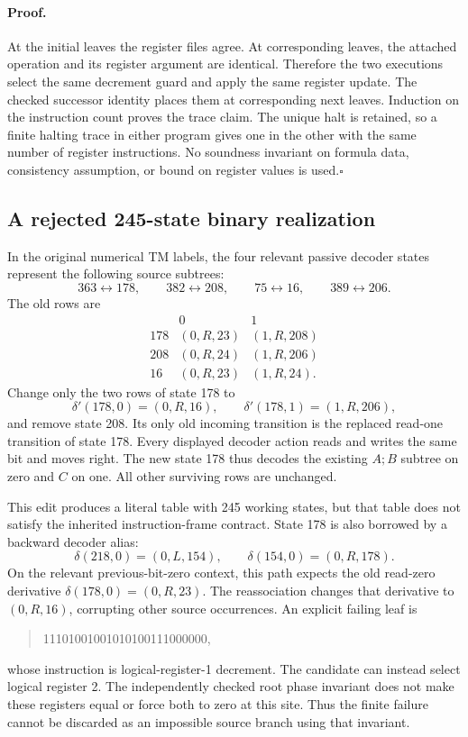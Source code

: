 \paragraph{Proof.}
At the initial leaves the register files agree.  At corresponding leaves,
the attached operation and its register argument are identical.  Therefore
the two executions select the same decrement guard and apply the same
register update.  The checked successor identity places them at
corresponding next leaves.  Induction on the instruction count proves the
trace claim.  The unique halt is retained, so a finite halting trace in
either program gives one in the other with the same number of register
instructions.  No soundness invariant on formula data, consistency
assumption, or bound on register values is used.\hfill$\square$

\subsection{A rejected 245-state binary realization}

In the original numerical TM labels, the four relevant passive decoder
states represent the following source subtrees:
\[
 363\leftrightarrow178,\qquad
 382\leftrightarrow208,\qquad
 75\leftrightarrow16,\qquad
 389\leftrightarrow206.
\]
The old rows are
\[
\begin{array}{c|cc}
 &0&1\\\hline
178&(0,R,23)&(1,R,208)\\
208&(0,R,24)&(1,R,206)\\
16 &(0,R,23)&(1,R,24).
\end{array}
\]
Change only the two rows of state 178 to
\[
 \delta'(178,0)=(0,R,16),\qquad
 \delta'(178,1)=(1,R,206),
\]
and remove state 208.  Its only old incoming transition is the replaced
read-one transition of state 178.  Every displayed decoder action reads
and writes the same bit and moves right.  The new state 178 thus decodes
the existing $A;B$ subtree on zero and $C$ on one.  All other surviving
rows are unchanged.

This edit produces a literal table with 245 working states, but that
table does not satisfy the inherited instruction-frame contract.  State
178 is also borrowed by a backward decoder alias:
\[
 \delta(218,0)=(0,L,154),\qquad
 \delta(154,0)=(0,R,178).
\]
On the relevant previous-bit-zero context, this path expects the old
read-zero derivative $\delta(178,0)=(0,R,23)$.  The reassociation changes
that derivative to $(0,R,16)$, corrupting other source occurrences.
An explicit failing leaf is
\begin{quote}\ttfamily\small
11101001001010100111000000,
\end{quote}
whose instruction is logical-register-1 decrement.  The candidate can
instead select logical register 2.  The independently checked root phase
invariant does not make these registers equal or force both to zero at
this site.  Thus the finite failure cannot be discarded as an impossible
source branch using that invariant.

